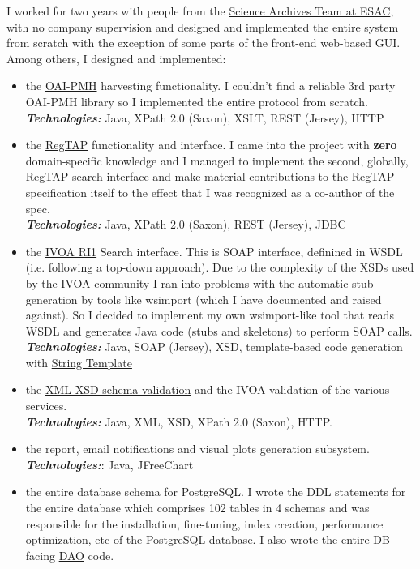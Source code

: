 \documentclass[10pt,a4paper]{article} %
\newcommand{\technologies}[0]{\textbf{\textit{Technologies:}}}
\begin{document}
{{{  I worked for two years with people from the \href{http://www.sciops.esa.int/index.php?project=SAT}{Science
    Archives Team at ESAC}, with no company supervision
  and designed and implemented the entire system from scratch with the exception of some parts
  of the front-end web-based GUI.
  Among others, I designed and implemented:
  \begin{itemize}
  \item the \href{http://www.openarchives.org/pmh/}{OAI-PMH} harvesting functionality. I couldn't find a reliable 3rd party OAI-PMH library
    so I implemented the entire protocol from scratch.\\
    \technologies{} Java, XPath 2.0 (Saxon), XSLT, REST (Jersey), HTTP
  \item the \href{http://www.ivoa.net/documents/RegTAP/}{RegTAP} functionality and interface. I came into the project with \textbf{zero} domain-specific
    knowledge and I managed to implement the second, globally, RegTAP search interface and make material
    contributions to the RegTAP specification itself to the effect that I was recognized as a co-author of the spec.\\
    \technologies{} Java, XPath 2.0 (Saxon), REST (Jersey), JDBC
  \item the \href{http://www.ivoa.net/documents/RegistryInterface/20091104/REC-RegistryInterface-1.0.pdf}{IVOA RI1} Search interface. This is SOAP interface, definined in WSDL (i.e. following a top-down approach). 
    Due to the complexity of the XSDs used by the IVOA community I ran into problems with the automatic stub
    generation by tools like wsimport (which I have documented and raised against). So I decided to implement
    my own wsimport-like tool that reads WSDL and generates Java code (stubs and skeletons) to perform SOAP calls.\\
    \technologies{} Java, SOAP (Jersey), XSD, template-based code generation with \href{http://www.stringtemplate.org/.}{String Template}
  \item the \href{https://en.wikipedia.org/wiki/XML_Schema_(W3C)}{XML XSD schema-validation}
    and the IVOA validation of the various services.
    \\
    \technologies{} Java, XML, XSD, XPath 2.0 (Saxon), HTTP.
  \item the report, email notifications and visual plots generation subsystem.
    \\
    \technologies{}: Java, JFreeChart
    \item the entire database schema for PostgreSQL. I wrote the DDL statements for the entire database which comprises 102 tables in 4 schemas and was responsible for the installation, fine-tuning, index creation, performance optimization, etc of the PostgreSQL database. I also wrote the entire DB-facing \href{https://en.wikipedia.org/wiki/Database_abstraction_layer}{DAO} code.\\

\end{itemize}}}}
\end{document}
